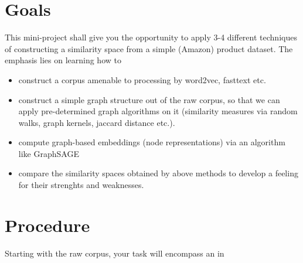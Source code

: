 \documentclass[review]{elsarticle}
\begin{document}
\section{Goals}
\label{sect:goals}

This mini-project shall give you the opportunity to apply 3-4 different techniques of constructing a similarity space from a simple (Amazon) product dataset. The emphasis lies on learning how to

\begin{itemize}
  \item construct a corpus amenable to processing by word2vec, fasttext etc.
  \item construct a simple graph structure out of the raw corpus, so that we can apply pre-determined graph algorithms on it (similarity measures via random walks, graph kernels, jaccard distance etc.).
  \item compute graph-based embeddings (node representations) via an algorithm like GraphSAGE
  \item compare the similarity spaces obtained by above methods to develop a feeling for their strenghts and weaknesses.
\end{itemize}



\section{Procedure}
\label{sect:procedure}

Starting with the raw corpus, your task will encompass an in


\end{document}
